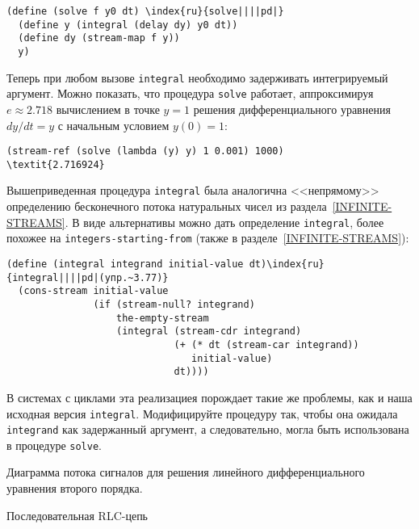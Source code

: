 \begin{Verbatim}[fontsize=\small]
(define (solve f y0 dt) \index{ru}{solve||||pd|}
  (define y (integral (delay dy) y0 dt))
  (define dy (stream-map f y))
  y)
\end{Verbatim}
Теперь при любом вызове {\tt integral} необходимо
задерживать интегрируемый аргумент.  Можно показать, что процедура
{\tt solve} работает, аппроксимируя $e \approx
2.718$ вычислением в точке $y = 1$ решения
дифференциального уравнения $dy/dt = y$ с начальным
условием $y(0) = 1$:

\begin{Verbatim}[fontsize=\small]
(stream-ref (solve (lambda (y) y) 1 0.001) 1000)
\textit{2.716924}
\end{Verbatim}
\begin{exercise}{3.77}\label{EX3.77}%
Вышеприведенная процедура {\tt integral} была
аналогична <<непрямому>> определению бесконечного потока натуральных
чисел из раздела~\ref{INFINITE-STREAMS}.  В виде
альтернативы можно дать определение {\tt integral}, более
похожее на {\tt integers-starting-from} (также в
разделе~\ref{INFINITE-STREAMS}):

\begin{Verbatim}[fontsize=\small]
(define (integral integrand initial-value dt)\index{ru}{integral||||pd|(упр.~3.77)}
  (cons-stream initial-value
               (if (stream-null? integrand)
                   the-empty-stream
                   (integral (stream-cdr integrand)
                             (+ (* dt (stream-car integrand))
                                initial-value)
                             dt))))
\end{Verbatim}
В системах с циклами эта реализациея порождает такие же проблемы,
как и наша исходная версия {\tt integral}.  Модифицируйте
процедуру так, чтобы она ожидала {\tt integrand} как задержанный
аргумент, а следовательно, могла быть использована в процедуре
{\tt solve}.
\end{exercise}

\begin{cntrfig}

\caption{Диаграмма потока сигналов для решения
линейного дифференциального уравнения второго
порядка.}
\label{P3.35}
\end{cntrfig}

\begin{cntrfig}

\caption{Последовательная RLC-цепь}
\label{P3.36}
\end{cntrfig}

